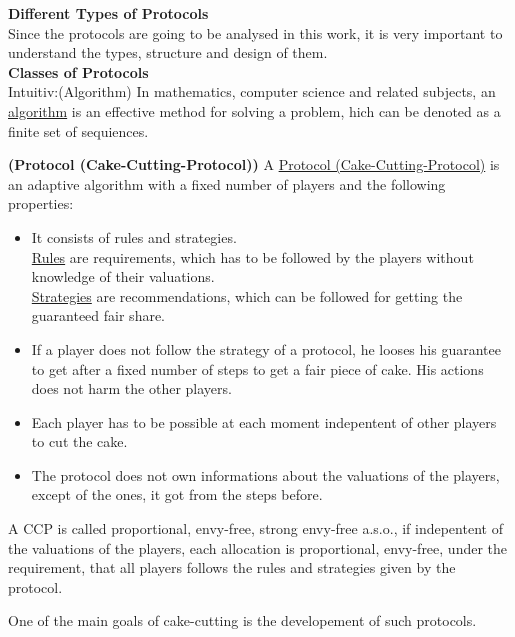\newpage
\textbf{Different Types of Protocols}\\
\newline
Since the protocols are going to be analysed in this work, it is very important to understand the types, structure and design of them.\\
\newline
\textbf{Classes of Protocols}\\
\newline
Intuitiv:(Algorithm)
\newline In mathematics, computer science and related subjects, an
\underline{algorithm} is an effective method for solving a problem, hich can be denoted as a finite set of sequiences.
\begin{defi}{\textbf{(Protocol (Cake-Cutting-Protocol))}}
\newline A \underline{Protocol (Cake-Cutting-Protocol)} is an adaptive algorithm with a fixed number of players and the following properties:
\begin{itemize}
\item{It consists of rules and strategies.\\ \underline{Rules} are requirements, which has to be followed by the players without knowledge of their valuations.\\
\underline{Strategies} are recommendations, which can be followed for getting the guaranteed fair share.}
\item{If a player does not follow the strategy of a protocol, he looses his guarantee to get after a fixed number of steps to get a fair piece of cake. His actions does not harm the other players.}
\item Each player has to be possible at each moment indepentent of other players to cut the cake.
\item The protocol does not own informations about the valuations of the players, except of the ones, it got from the steps before.
\end{itemize}
\end{defi}
\begin{defi}
A CCP is called proportional, envy-free, strong envy-free a.s.o., if indepentent of the valuations of the players, each allocation is proportional, envy-free, \cdots under the requirement, that all players follows the rules and strategies given by the protocol.
\end{defi}
One of the main goals of cake-cutting is the developement of such protocols.

